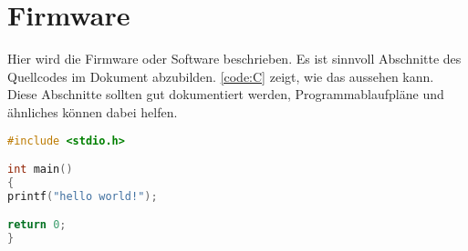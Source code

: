 

\section{Firmware}
	
Hier wird die Firmware oder Software beschrieben. Es ist sinnvoll Abschnitte des Quellcodes im Dokument abzubilden. \autoref{code:C} zeigt, wie das aussehen kann. Diese Abschnitte sollten gut dokumentiert werden, Programmablaufpläne und ähnliches können dabei helfen.


\begin{lstlisting}[language=c, caption={C Beispiel}, label=code:C]
#include <stdio.h>

int main()
{
printf("hello world!");                    

return 0;
}
\end{lstlisting}